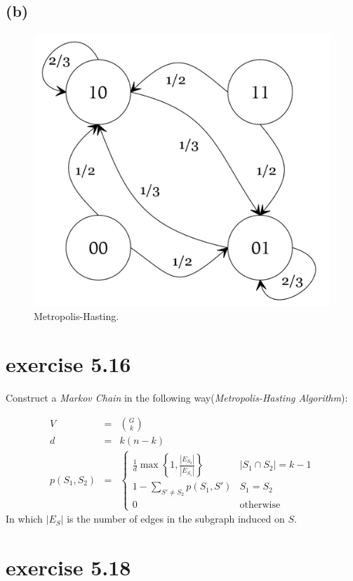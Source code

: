 \documentclass[paper=a4, fontsize=11pt]{scrartcl} %
\numberwithin{equation}{section} %
\numberwithin{figure}{section} %
\numberwithin{table}{section} %
\begin{document}
\subsection*{(b)}

\begin{figure}[H]
	\centering
	\includegraphics[width=350pt]{metro-13.png}
	\caption{Metropolis-Hasting.}
\end{figure}

\section*{exercise 5.16}
Construct a {\it Markov Chain} in the following way({\it Metropolis-Hasting Algorithm}):

\begin{eqnarray*}
V & = & {G \choose k} \\
d & = & k(n - k)  \\
p\left(S_1, S_2\right) & = & \left\{
\begin{array}{ll} 
\frac{1}{d} \max\left\{1, \frac{|E_{S_2}|}{|E_{S_1}|} \right\}& \left|S_1 \cap S_2\right| = k - 1\\ 
1 - \sum\limits_{S'\not= S_2} p(S_1, S') & S_1 = S_2 \\
0 & \textrm{otherwise} 
\end{array}\right. 
\end{eqnarray*}
In which $|E_S|$ is the number of edges in the subgraph induced on $S$.

\section*{exercise 5.18}
\end{document}
